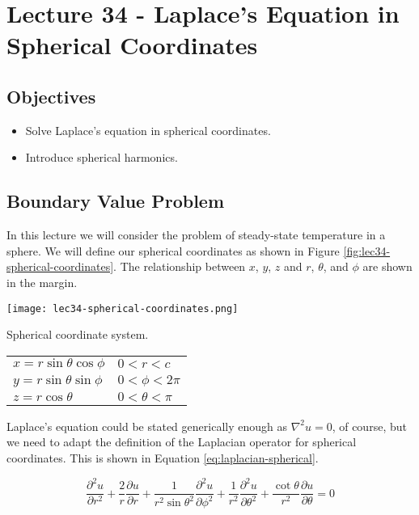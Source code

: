 \chapter{Lecture 34 - Laplace's Equation in Spherical Coordinates}
\label{ch:lec34}
\section{Objectives}
\begin{itemize}
\item Solve Laplace's equation in spherical coordinates. 
\item Introduce spherical harmonics.
\end{itemize}
\setcounter{lstannotation}{0}

\section{Boundary Value Problem}

In this lecture we will consider the problem of steady-state temperature in a sphere.  We will define our spherical coordinates as shown in Figure \ref{fig:lec34-spherical-coordinates}.  The relationship between $x$, $y$, $z$ and $r$, $\theta$, and $\phi$ are shown in the margin.
\begin{marginfigure}
\texttt{[image: lec34-spherical-coordinates.png]}
\caption{Spherical coordinate system.}
\label{fig:lec34-spherical-coordinates}
\end{marginfigure}
\begin{margintable}
\begin{tabular}{l l}
$x = r\sin{\theta}\cos{\phi}$ & $0<r<c$ \\
$y = r\sin{\theta}\sin{\phi}$ & $0< \phi < 2\pi$ \\
$z = r\cos{\theta}$ & $0 < \theta < \pi$ \\
\end{tabular}
\end{margintable}

Laplace's equation could be stated generically enough as $\nabla^2u = 0$, of course, but we need to adapt the definition of the Laplacian operator for spherical coordinates.  This is shown in Equation \ref{eq:laplacian-spherical}.

\begin{equation}
\frac{\partial^2 u}{\partial r^2} + \frac{2}{r}\frac{\partial u}{\partial r} + \frac{1}{r^2 \sin{\theta}^2} \frac{\partial^2 u}{\partial \phi^2} + \frac{1}{r^2}\frac{\partial^2 u}{\partial \theta^2} + \frac{\cot{\theta}}{r^2}\frac{\partial u}{\partial \theta} = 0
\label{eq:laplacian-spherical}
\end{equation}

